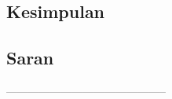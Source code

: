 \chapter{\babEnam}

\section{Kesimpulan}


\section{Saran}
--------------------------------------------